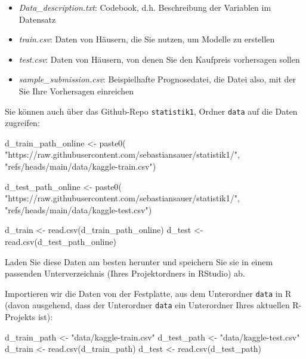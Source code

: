 \documentclass[
  letterpaper,
]{scrbook}
\newenvironment{Shaded}{\begin{snugshade}}{\end{snugshade}}
\newcommand{\FunctionTok}[1]{\textcolor[rgb]{0.28,0.35,0.67}{#1}}
\newcommand{\NormalTok}[1]{\textcolor[rgb]{0.00,0.23,0.31}{#1}}
\newcommand{\OtherTok}[1]{\textcolor[rgb]{0.00,0.23,0.31}{#1}}
\newcommand{\StringTok}[1]{\textcolor[rgb]{0.13,0.47,0.30}{#1}}
\providecommand{\tightlist}{%
  \setlength{\itemsep}{0pt}\setlength{\parskip}{0pt}}\usepackage{longtable,booktabs,array}
\theoremstyle{definition}
\theoremstyle{definition}
\theoremstyle{definition}
\theoremstyle{remark}
\begin{document}
\begin{itemize}
\tightlist
\item
  \emph{Data\_description.txt}: Codebook, d.h. Beschreibung der
  Variablen im Datensatz
\item
  \emph{train.csv}: Daten von Häusern, die Sie nutzen, um Modelle zu
  erstellen
\item
  \emph{test.csv}: Daten von Häusern, von denen Sie den Kaufpreis
  vorhersagen sollen
\item
  \emph{sample\_submission.csv}: Beispielhafte Prognosedatei, die Datei
  also, mit der Sie Ihre Vorhersagen einreichen
\end{itemize}

Sie können auch über das Github-Repo \texttt{statistik1}, Ordner
\texttt{data} auf die Daten zugreifen:

\begin{Shaded}
\begin{Highlighting}[]
\NormalTok{d\_train\_path\_online }\OtherTok{\textless{}{-}} \FunctionTok{paste0}\NormalTok{(}
    \StringTok{"https://raw.githubusercontent.com/sebastiansauer/statistik1/"}\NormalTok{,}
    \StringTok{"refs/heads/main/data/kaggle{-}train.csv"}\NormalTok{)}

\NormalTok{d\_test\_path\_online }\OtherTok{\textless{}{-}} \FunctionTok{paste0}\NormalTok{(}
\StringTok{"https://raw.githubusercontent.com/sebastiansauer/statistik1/"}\NormalTok{,}
    \StringTok{"refs/heads/main/data/kaggle{-}test.csv"}\NormalTok{)}

\NormalTok{d\_train }\OtherTok{\textless{}{-}} \FunctionTok{read.csv}\NormalTok{(d\_train\_path\_online)}
\NormalTok{d\_test }\OtherTok{\textless{}{-}} \FunctionTok{read.csv}\NormalTok{(d\_test\_path\_online)}
\end{Highlighting}
\end{Shaded}

Laden Sie diese Daten am besten herunter und speichern Sie sie in einem
passenden Unterverzeichnis (Ihres Projektordners in RStudio) ab.

Importieren wir die Daten von der Festplatte, aus dem Unterordner
\texttt{data} in R (davon ausgehend, dass der Unterordner \texttt{data}
ein Unterordner Ihres aktuellen R-Projekts ist):

\begin{Shaded}
\begin{Highlighting}[]
\NormalTok{d\_train\_path }\OtherTok{\textless{}{-}} \StringTok{"data/kaggle{-}train.csv"}
\NormalTok{d\_test\_path }\OtherTok{\textless{}{-}} \StringTok{"data/kaggle{-}test.csv"}
\NormalTok{d\_train }\OtherTok{\textless{}{-}} \FunctionTok{read.csv}\NormalTok{(d\_train\_path)}
\NormalTok{d\_test }\OtherTok{\textless{}{-}} \FunctionTok{read.csv}\NormalTok{(d\_test\_path)}
\end{Highlighting}
\end{Shaded}
\end{document}
